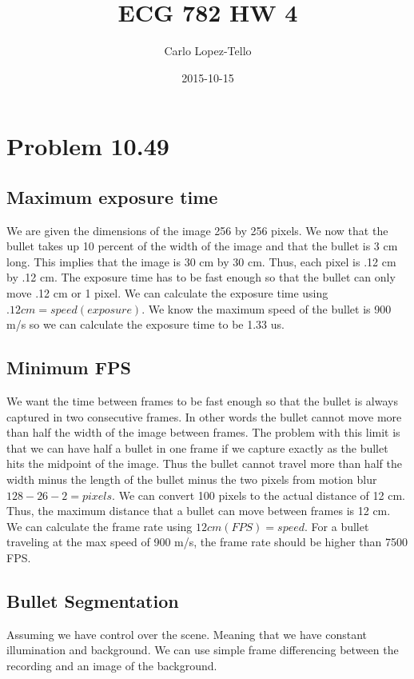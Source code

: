 \documentclass{article}
\title{ECG 782 HW 4}
\date{2015-10-15}
\author{Carlo Lopez-Tello}
\begin{document}
\maketitle
	\newpage
	\section{Problem 10.49}
	
	\subsection{Maximum exposure time}
	We are given the dimensions of the image 256 by 256 pixels. We now that the bullet takes up 10 percent of the width of the image and that the bullet is 3 cm long. This implies that the image is 30 cm by 30 cm. Thus, each pixel is .12 cm by .12 cm. The exposure time has to be fast enough so that the bullet can only move .12 cm or 1 pixel. We can calculate the exposure time using \(.12 cm = speed(exposure)\). We know the maximum speed of the bullet is 900 m/s so we can calculate the exposure time to be 1.33 us.
	
	\subsection{Minimum FPS}
	We want the time between frames to be fast enough so that the bullet is always captured in two consecutive frames. In other words the bullet cannot move more than half the width of the image between frames. The problem with this limit is that we can have half a bullet in one frame if we capture exactly as the bullet hits the midpoint of the image. Thus the bullet cannot travel more than half the width minus the length of the bullet minus the two pixels from motion blur \(128 - 26 - 2 = pixels\). We can convert 100 pixels to the actual distance of 12 cm. Thus, the maximum distance that a bullet can move between frames is 12 cm. We can calculate the frame rate using \(12 cm(FPS) = speed\). For a bullet traveling at the max speed of 900 m/s, the frame rate should be higher than 7500 FPS.
	
	\subsection{Bullet Segmentation}
	Assuming we have control over the scene. Meaning that we have constant illumination and background. We can use simple frame differencing between the recording and an image of the background.
	
\end{document}
